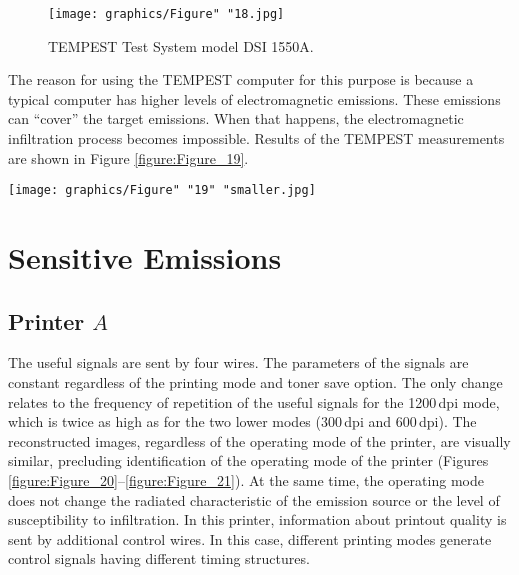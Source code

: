 \documentclass[letterpaper,journal]{ieeetran}
\begin{document}
\begin{figure}[ht]
    \centering
    \texttt{[image: graphics/Figure" "18.jpg]}
    \caption{TEMPEST Test System model DSI 1550A.}
    \label{figure:Figure_18}
\end{figure}

The reason for using the TEMPEST computer for this purpose is because a
typical computer has higher levels of electromagnetic emissions. These
emissions can ``cover'' the target
emissions. When that happens, the electromagnetic infiltration process
becomes impossible. Results of the TEMPEST measurements are shown in Figure
\ref{figure:Figure_19}.

\begin{figure*}[ht]
    \centering
    \texttt{[image: graphics/Figure" "19" "smaller.jpg]}
    \caption{Radiated disturbances measured from the $A$ and $B$ printers,
        both operating in 600\,dpi mode (with Eco option); bandwidth =
        \SI{1}{\mega\hertz}.}
    \label{figure:Figure_19}
\end{figure*}

\section{Sensitive Emissions}

\subsection{Printer $A$}

The useful signals are sent by four wires. The parameters of the signals are
constant regardless of the printing mode and toner save option. The only
change relates to the frequency of repetition of the useful signals for the
1200\,dpi mode, which is twice as high as for the two lower modes (300\,dpi
and 600\,dpi). The reconstructed images, regardless of the operating mode of
the printer, are visually similar, precluding identification of the operating
mode of the printer (Figures \ref{figure:Figure_20}--\ref{figure:Figure_21}).
At the same time, the operating mode does not change the radiated
characteristic of the emission source or the level of susceptibility to
infiltration. In this printer, information about printout quality is sent by
additional control wires. In this case, different printing modes generate
control signals having different timing structures.
\end{document}
